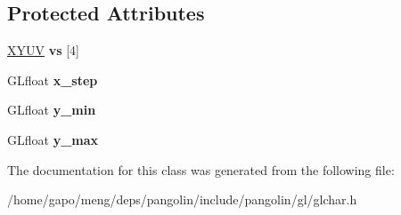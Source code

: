 \subsection*{Protected Attributes}
\begin{DoxyCompactItemize}
\item 
\hyperlink{structpangolin_1_1_x_y_u_v}{X\+Y\+UV} {\bfseries vs} \mbox{[}4\mbox{]}\hypertarget{classpangolin_1_1_gl_char_aa60e23902d2c8a5e97edef12b84e50f6}{}\label{classpangolin_1_1_gl_char_aa60e23902d2c8a5e97edef12b84e50f6}

\item 
G\+Lfloat {\bfseries x\+\_\+step}\hypertarget{classpangolin_1_1_gl_char_a0d7f884feb35aaf7e88c7b05745eea3e}{}\label{classpangolin_1_1_gl_char_a0d7f884feb35aaf7e88c7b05745eea3e}

\item 
G\+Lfloat {\bfseries y\+\_\+min}\hypertarget{classpangolin_1_1_gl_char_a5b6d3467e58e2b0d4995f0304addd198}{}\label{classpangolin_1_1_gl_char_a5b6d3467e58e2b0d4995f0304addd198}

\item 
G\+Lfloat {\bfseries y\+\_\+max}\hypertarget{classpangolin_1_1_gl_char_af9f3a2e312504ac9b1e604af012a7edf}{}\label{classpangolin_1_1_gl_char_af9f3a2e312504ac9b1e604af012a7edf}

\end{DoxyCompactItemize}


The documentation for this class was generated from the following file\+:\begin{DoxyCompactItemize}
\item 
/home/gapo/meng/deps/pangolin/include/pangolin/gl/glchar.\+h\end{DoxyCompactItemize}
